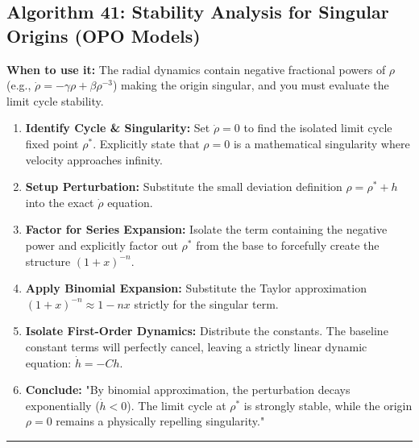 \documentclass[11pt, a4paper]{report}
\begin{document}
\subsection*{Algorithm 41: Stability Analysis for Singular Origins (OPO Models)}
\textbf{When to use it:} The radial dynamics contain negative fractional powers of $\rho$ (e.g., $\dot{\rho} = -\gamma\rho + \beta\rho^{-3}$) making the origin singular, and you must evaluate the limit cycle stability.
\begin{enumerate}[label=\textbf{\arabic*.}]
    \item \textbf{Identify Cycle \& Singularity:} Set $\dot{\rho} = 0$ to find the isolated limit cycle fixed point $\rho^*$. Explicitly state that $\rho = 0$ is a mathematical singularity where velocity approaches infinity.
    \item \textbf{Setup Perturbation:} Substitute the small deviation definition $\rho = \rho^* + h$ into the exact $\dot{\rho}$ equation.
    \item \textbf{Factor for Series Expansion:} Isolate the term containing the negative power and explicitly factor out $\rho^*$ from the base to forcefully create the structure $(1 + x)^{-n}$.
    \item \textbf{Apply Binomial Expansion:} Substitute the Taylor approximation $(1+x)^{-n} \approx 1 - nx$ strictly for the singular term.
    \item \textbf{Isolate First-Order Dynamics:} Distribute the constants. The baseline constant terms will perfectly cancel, leaving a strictly linear dynamic equation: $\dot{h} = -C h$.
    \item \textbf{Conclude:} "By binomial approximation, the perturbation decays exponentially ($\dot{h} < 0$). The limit cycle at $\rho^*$ is strongly stable, while the origin $\rho = 0$ remains a physically repelling singularity."
\end{enumerate}
\vspace{1em}
\noindent\rule{\textwidth}{0.4pt}
\vspace{1em}
\end{document}
